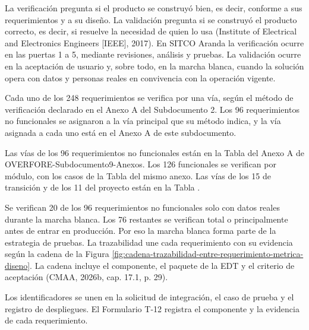 \documentclass[subdoc]{../../comun/overfore}
\begin{document}
La verificación pregunta si el producto se construyó bien, es decir, conforme a sus requerimientos y a su diseño. La validación pregunta si se construyó el producto correcto, es decir, si resuelve la necesidad de quien lo usa (Institute of Electrical and Electronics Engineers [IEEE], 2017). En SITCO Aranda la verificación ocurre en las puertas 1 a 5, mediante revisiones, análisis y pruebas. La validación ocurre en la aceptación de usuario y, sobre todo, en la marcha blanca, cuando la solución opera con datos y personas reales en convivencia con la operación vigente.

Cada uno de los 248 requerimientos se verifica por una vía, según el método de verificación declarado en el Anexo A del Subdocumento 2. Los 96 requerimientos no funcionales se asignaron a la vía principal que su método indica, y la vía asignada a cada uno está en el Anexo A de este subdocumento.

Las vías de los 96 requerimientos no funcionales están en la Tabla  del Anexo A de OVERFORE-Subdocumento9-Anexos. Los 126 funcionales se verifican por módulo, con los casos de la Tabla  del mismo anexo. Las vías de los 15 de transición y de los 11 del proyecto están en la Tabla .

Se verifican 20 de los 96 requerimientos no funcionales solo con datos reales durante la marcha blanca. Los 76 restantes se verifican total o principalmente antes de entrar en producción. Por eso la marcha blanca forma parte de la estrategia de pruebas. La trazabilidad une cada requerimiento con su evidencia según la cadena de la Figura \ref{fig:cadena-trazabilidad-entre-requerimiento-metrica-diseno}. La cadena incluye el componente, el paquete de la EDT y el criterio de aceptación (CMAA, 2026b, cap. 17.1, p. 29).

Los identificadores se unen en la solicitud de integración, el caso de prueba y el registro de despliegues. El Formulario T-12 registra el componente y la evidencia de cada requerimiento.
\end{document}
